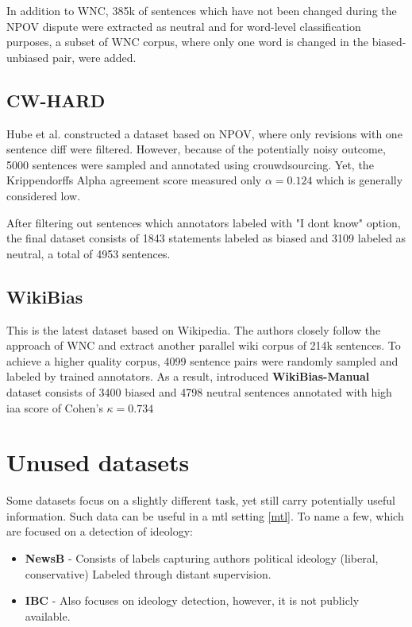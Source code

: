In addition to WNC, 385k of sentences which have not been changed during the NPOV dispute were extracted as neutral and for word-level classification purposes, a subset of WNC corpus, where only one word is changed in the biased-unbiased pair, were added.




\subsection{CW-HARD}
Hube et al. \cite{hube2019neural} constructed a dataset based on NPOV, where only revisions with one sentence diff were filtered. However, because of the potentially noisy outcome, 5000 sentences were sampled and annotated using crouwdsourcing. Yet, the Krippendorffs Alpha agreement score measured only $\alpha = 0.124$ which is generally considered low. 

After filtering out sentences which annotators labeled with "I dont know" option, the final dataset consists of 1843 statements labeled as biased and 3109 labeled as neutral, a total of 4953 sentences.




\subsection{WikiBias}
This is the latest dataset based on Wikipedia. The authors \cite{zhong-etal-2021-wikibias-detecting} closely follow the approach of WNC \cite{pryzant2020automatically} and extract another parallel wiki corpus of 214k sentences.
To achieve a higher quality corpus, 4099 sentence pairs were randomly sampled and labeled by trained annotators. As a result, introduced \textbf{WikiBias-Manual} dataset consists of 3400 biased and 4798 neutral sentences annotated with high \gls{iaa} score of Cohen's $\kappa = 0.734$





\section{Unused datasets}
 Some datasets focus on a slightly different task, yet still carry potentially useful information. Such data can be useful in a \gls{mtl} setting \ref{mtl}. To name a few, which are focused on a detection of ideology:
\begin{itemize}
\item \textbf{NewsB} - 
Consists of labels capturing authors political ideology (liberal, conservative) Labeled through distant supervision.
\item \textbf{IBC} - Also focuses on ideology detection, however, it is not publicly available.
\end{itemize}



